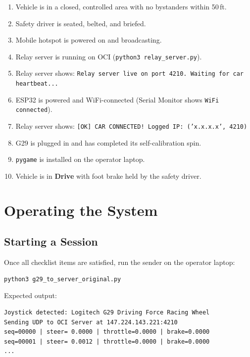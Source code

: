 ﻿\documentclass[12pt, letterpaper]{article}
\begin{document}
\begin{enumerate}[label=$\square$, leftmargin=2em]
  \item Vehicle is in a closed, controlled area with no bystanders within 50\,ft.
  \item Safety driver is seated, belted, and briefed.
  \item Mobile hotspot is powered on and broadcasting.
  \item Relay server is running on OCI (\lstinline[style=terminal]{python3 relay_server.py}).
  \item Relay server shows: \lstinline[style=terminal]{Relay server live on port 4210. Waiting for car heartbeat...}
  \item ESP32 is powered and WiFi-connected (Serial Monitor shows \lstinline[style=terminal]{WiFi connected}).
  \item Relay server shows: \texttt{[OK] CAR CONNECTED! Logged IP: ('x.x.x.x', 4210)}
  \item G29 is plugged in and has completed its self-calibration spin.
  \item \texttt{pygame} is installed on the operator laptop.
  \item Vehicle is in \textbf{Drive} with foot brake held by the safety driver.
\end{enumerate}

\section{Operating the System}

\subsection{Starting a Session}

Once all checklist items are satisfied, run the sender on the operator laptop:

\begin{lstlisting}[style=terminal]
python3 g29_to_server_original.py
\end{lstlisting}

Expected output:
\begin{lstlisting}[style=terminal]
Joystick detected: Logitech G29 Driving Force Racing Wheel
Sending UDP to OCI Server at 147.224.143.221:4210
seq=00000 | steer= 0.0000 | throttle=0.0000 | brake=0.0000
seq=00001 | steer= 0.0012 | throttle=0.0000 | brake=0.0000
...
\end{lstlisting}
\end{document}
